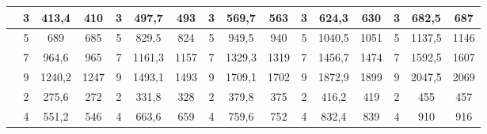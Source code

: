 \documentclass[a4paper]{article}
\begin{document}
\begin{table}[!h]
\begin{tabular}{|c|ccc|ccc|ccc|ccc|ccc|}
                                                         & \multicolumn{1}{c|}{3}  & \multicolumn{1}{c|}{413,4}         & 410              & \multicolumn{1}{c|}{3}  & \multicolumn{1}{c|}{497,7}         & 493              & \multicolumn{1}{c|}{3}  & \multicolumn{1}{c|}{569,7}         & 563              & \multicolumn{1}{c|}{3}  & \multicolumn{1}{c|}{624,3}         & 630              & \multicolumn{1}{c|}{3}  & \multicolumn{1}{c|}{682,5}         & 687              \\ \hline
                                                         & \multicolumn{1}{c|}{5}  & \multicolumn{1}{c|}{689}           & 685              & \multicolumn{1}{c|}{5}  & \multicolumn{1}{c|}{829,5}         & 824              & \multicolumn{1}{c|}{5}  & \multicolumn{1}{c|}{949,5}         & 940              & \multicolumn{1}{c|}{5}  & \multicolumn{1}{c|}{1040,5}        & 1051             & \multicolumn{1}{c|}{5}  & \multicolumn{1}{c|}{1137,5}        & 1146             \\ \hline
                                                         & \multicolumn{1}{c|}{7}  & \multicolumn{1}{c|}{964,6}         & 965              & \multicolumn{1}{c|}{7}  & \multicolumn{1}{c|}{1161,3}        & 1157             & \multicolumn{1}{c|}{7}  & \multicolumn{1}{c|}{1329,3}        & 1319             & \multicolumn{1}{c|}{7}  & \multicolumn{1}{c|}{1456,7}        & 1474             & \multicolumn{1}{c|}{7}  & \multicolumn{1}{c|}{1592,5}        & 1607             \\ \hline
                                                         & \multicolumn{1}{c|}{9}  & \multicolumn{1}{c|}{1240,2}        & 1247             & \multicolumn{1}{c|}{9}  & \multicolumn{1}{c|}{1493,1}        & 1493             & \multicolumn{1}{c|}{9}  & \multicolumn{1}{c|}{1709,1}        & 1702             & \multicolumn{1}{c|}{9}  & \multicolumn{1}{c|}{1872,9}        & 1899             & \multicolumn{1}{c|}{9}  & \multicolumn{1}{c|}{2047,5}        & 2069             \\ \hline
                                                         & \multicolumn{1}{c|}{2}  & \multicolumn{1}{c|}{275,6}         & 272              & \multicolumn{1}{c|}{2}  & \multicolumn{1}{c|}{331,8}         & 328              & \multicolumn{1}{c|}{2}  & \multicolumn{1}{c|}{379,8}         & 375              & \multicolumn{1}{c|}{2}  & \multicolumn{1}{c|}{416,2}         & 419              & \multicolumn{1}{c|}{2}  & \multicolumn{1}{c|}{455}           & 457              \\ \hline
                                                         & \multicolumn{1}{c|}{4}  & \multicolumn{1}{c|}{551,2}         & 546              & \multicolumn{1}{c|}{4}  & \multicolumn{1}{c|}{663,6}         & 659              & \multicolumn{1}{c|}{4}  & \multicolumn{1}{c|}{759,6}         & 752              & \multicolumn{1}{c|}{4}  & \multicolumn{1}{c|}{832,4}         & 839              & \multicolumn{1}{c|}{4}  & \multicolumn{1}{c|}{910}           & 916              \\ \hline

\end{tabular}
\end{table}
\end{document}
